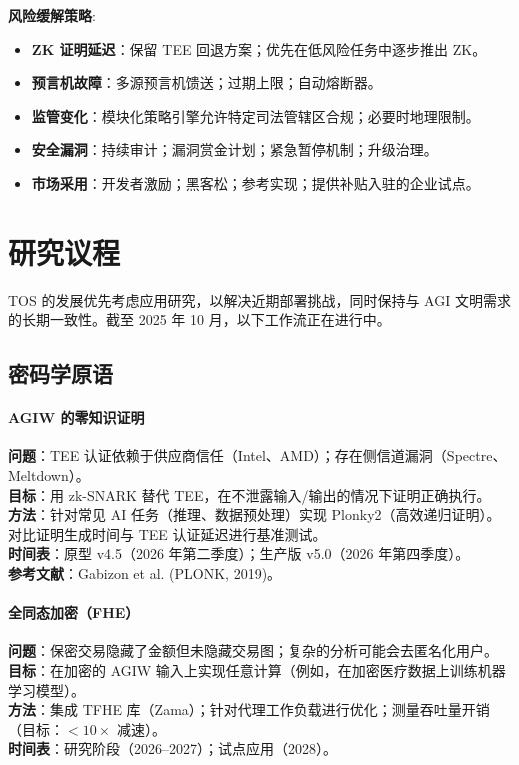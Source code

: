 \documentclass[11pt]{article}
\begin{document}
\textbf{风险缓解策略}:
\begin{itemize}[noitemsep]
  \item \textbf{ZK 证明延迟}：保留 TEE 回退方案；优先在低风险任务中逐步推出 ZK。
  \item \textbf{预言机故障}：多源预言机馈送；过期上限；自动熔断器。
  \item \textbf{监管变化}：模块化策略引擎允许特定司法管辖区合规；必要时地理限制。
  \item \textbf{安全漏洞}：持续审计；漏洞赏金计划；紧急暂停机制；升级治理。
  \item \textbf{市场采用}：开发者激励；黑客松；参考实现；提供补贴入驻的企业试点。
\end{itemize}

\section{研究议程}
\label{sec:research}

TOS 的发展优先考虑应用研究，以解决近期部署挑战，同时保持与 AGI 文明需求的长期一致性。截至 2025 年 10 月，以下工作流正在进行中。

\subsection{密码学原语}

\paragraph{AGIW 的零知识证明}
\textbf{问题}：TEE 认证依赖于供应商信任（Intel、AMD）；存在侧信道漏洞（Spectre、Meltdown）。\\
\textbf{目标}：用 zk-SNARK 替代 TEE，在不泄露输入/输出的情况下证明正确执行。\\
\textbf{方法}：针对常见 AI 任务（推理、数据预处理）实现 Plonky2（高效递归证明）。对比证明生成时间与 TEE 认证延迟进行基准测试。\\
\textbf{时间表}：原型 v4.5（2026 年第二季度）；生产版 v5.0（2026 年第四季度）。\\
\textbf{参考文献}：Gabizon et al. (PLONK, 2019)。

\paragraph{全同态加密（FHE）}
\textbf{问题}：保密交易隐藏了金额但未隐藏交易图；复杂的分析可能会去匿名化用户。\\
\textbf{目标}：在加密的 AGIW 输入上实现任意计算（例如，在加密医疗数据上训练机器学习模型）。\\
\textbf{方法}：集成 TFHE 库（Zama）；针对代理工作负载进行优化；测量吞吐量开销（目标：$<10\times$ 减速）。\\
\textbf{时间表}：研究阶段（2026--2027）；试点应用（2028）。
\end{document}
